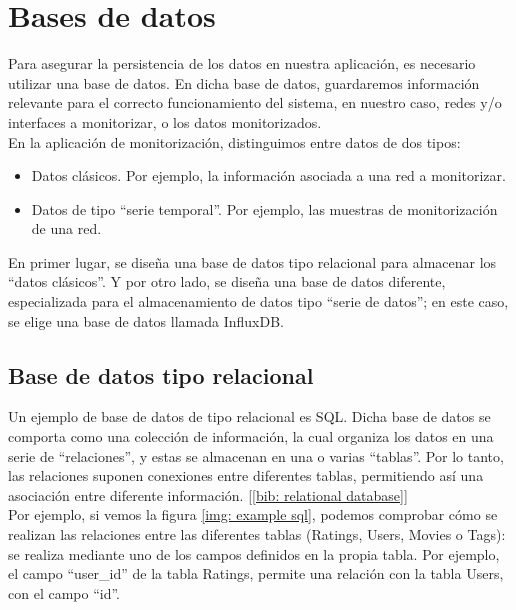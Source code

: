 \documentclass[a4paper, oneside, 12pt]{book}
\begin{document}
	
	\pagebreak
	
	\section{Bases de datos}
	
	\noindent Para asegurar la persistencia de los datos en nuestra aplicación, es necesario utilizar una base de datos. En dicha base de datos, guardaremos información relevante para el correcto funcionamiento del sistema, en nuestro caso, redes y/o interfaces a monitorizar, o los datos monitorizados. \\
	
	\noindent En la aplicación de monitorización, distinguimos entre datos de dos tipos:
	
	\begin{itemize}
		\item Datos clásicos. Por ejemplo, la información asociada a una red a monitorizar.
		\item Datos de tipo ``serie temporal''. Por ejemplo, las muestras de monitorización de una red.
	\end{itemize}

	\noindent En primer lugar, se diseña una base de datos tipo relacional para almacenar los ``datos clásicos''. Y por otro lado, se diseña una base de datos diferente, especializada para el almacenamiento de datos tipo ``serie de datos''; en este caso, se elige una base de datos llamada InfluxDB.
	
	\subsection{Base de datos tipo relacional}
	
	\noindent Un ejemplo de base de datos de tipo relacional es SQL. Dicha base de datos se comporta como una colección de información, la cual organiza los datos en una serie de ``relaciones'', y estas se almacenan en una o varias ``tablas''. Por lo tanto, las relaciones suponen conexiones entre diferentes tablas, permitiendo así una asociación entre diferente información. [\ref{bib: relational database}] \\
	
	\noindent Por ejemplo, si vemos la figura \ref{img: example sql}, podemos comprobar cómo se realizan las relaciones entre las diferentes tablas (Ratings, Users, Movies o Tags): se realiza mediante uno de los campos definidos en la propia tabla. Por ejemplo, el campo ``user\_id'' de la tabla Ratings, permite una relación con la tabla Users, con el campo ``id''.
	
\end{document}

